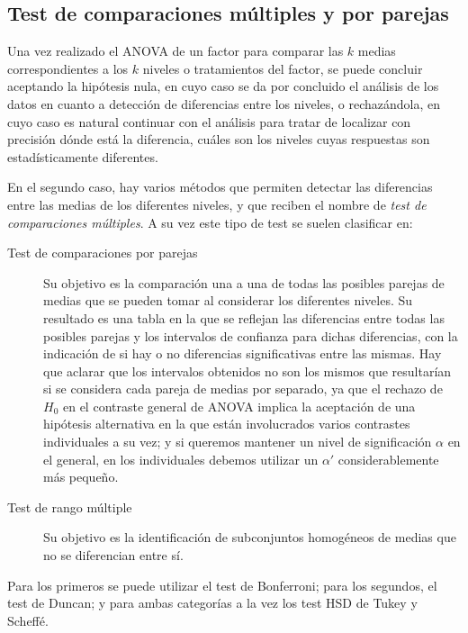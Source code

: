 \subsection{Test de comparaciones múltiples y por parejas}
Una vez realizado el ANOVA de un factor para comparar las $k$ medias correspondientes a los $k$ niveles o tratamientos del factor, se puede concluir aceptando la hipótesis nula, en cuyo caso se da por concluido el análisis de los datos en cuanto a detección de diferencias entre los niveles, o rechazándola, en cuyo caso es natural continuar con el análisis para tratar de localizar con precisión dónde está la diferencia, cuáles son los niveles cuyas respuestas son estadísticamente diferentes.

En el segundo caso, hay varios métodos que permiten detectar las diferencias entre las medias de los diferentes niveles, y que reciben el nombre de \emph{test de comparaciones múltiples}. A su
vez este tipo de test se suelen clasificar en:
\begin{description}
\item[Test de comparaciones por parejas] Su objetivo es la comparación una a una de todas las posibles parejas de medias que se pueden tomar al considerar los diferentes niveles. Su resultado es una tabla en la que se reflejan las diferencias entre todas las posibles parejas y los intervalos de confianza para dichas diferencias, con la indicación de si hay o no diferencias significativas entre las mismas. Hay que aclarar que los intervalos obtenidos no son los mismos que resultarían si se considera cada pareja de medias por separado, ya que el rechazo de $H_0$ en el contraste general de ANOVA implica la aceptación de una hipótesis alternativa en la que están involucrados varios contrastes individuales a su vez; y si queremos mantener un nivel de significación $\alpha$ en el general, en los individuales debemos utilizar un $\alpha'$ considerablemente más pequeño.
\item[Test de rango múltiple] Su objetivo es la identificación de subconjuntos homogéneos de medias que no se diferencian entre sí.
\end{description}
Para los primeros se puede utilizar el test de Bonferroni; para los segundos, el test de Duncan; y para ambas categorías a la vez los test HSD de Tukey y Scheffé.

\clearpage
\newpage

